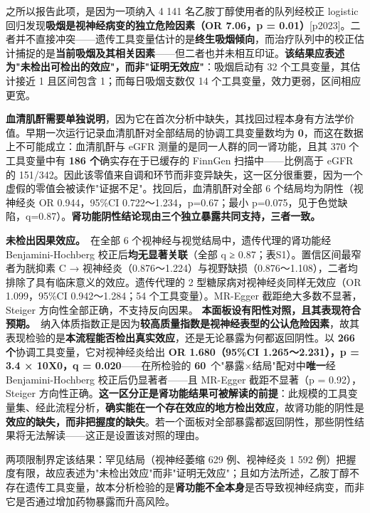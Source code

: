 \documentclass[UTF8,fontset=windows,11pt]{ctexart}
\begin{document}
之所以报告此项，是因为一项纳入 4 141 名乙胺丁醇使用者的队列经校正 logistic 回归发现\textbf{吸烟是视神经病变的独立危险因素（OR 7.06，p = 0.01）}[p2023]。二者并不直接冲突——遗传工具变量估计的是\textbf{终生吸烟倾向}，而治疗队列中的校正估计捕捉的是\textbf{当前吸烟及其相关因素}——但二者也并未相互印证。\textbf{该结果应表述为"未检出可检出的效应"，而非"证明无效应"}：吸烟启动有 32 个工具变量，其估计接近 1 且区间包含 1；而每日吸烟支数仅 14 个工具变量，效力更弱，区间相应更宽。

\textbf{血清肌酐需要单独说明}，因为它在首次分析中缺失，其找回过程本身有方法学价值。早期一次运行记录血清肌酐对全部结局的协调工具变量数均为 \textbf{0}，而这在数据上不可能成立：血清肌酐与 eGFR 测量的是同一人群的同一肾功能，且其 370 个工具变量中有 \textbf{186 个}确实存在于已缓存的 FinnGen 扫描中——比例高于 eGFR 的 151/342。因此该零值来自调和环节而非变异缺失，这一区分很重要，因为一个虚假的零值会被读作"证据不足"。找回后，血清肌酐对全部 6 个结局均为阴性（视神经炎 OR 0.944，95\%CI 0.722～1.234，p=0.67；最小 p=0.075，见于色觉缺陷，q=0.87）。\textbf{肾功能阴性结论现由三个独立暴露共同支持，三者一致。}

\textbf{未检出因果效应。}\ 在全部 6 个视神经与视觉结局中，遗传代理的肾功能经 Benjamini-Hochberg 校正后\textbf{均无显著关联}（全部 q ≥ 0.87；表S1）。置信区间最窄者为胱抑素 C → 视神经炎（0.876～1.224）与视野缺损（0.876～1.108），二者均排除了具有临床意义的效应。遗传代理的 2 型糖尿病对视神经炎同样无效应（OR 1.099，95\%CI 0.942～1.284；54 个工具变量）。MR-Egger 截距绝大多数不显著，Steiger 方向性全部正确，不支持反向因果。 \textbf{本面板设有阳性对照，且其表现符合预期。}\ 纳入体质指数正是因为\textbf{较高质量指数是视神经表型的公认危险因素}，故其表现检验的是\textbf{本流程能否检出真实效应}，还是无论暴露为何都返回阴性。以 \textbf{266 个}协调工具变量，它对视神经炎给出 \textbf{OR 1.680（95\%CI 1.265～2.231），p = 3.4 × 10 X0 ，q = 0.020}——在所检验的 \textbf{60}\ 个"暴露×结局"配对中\textbf{唯一}经 Benjamini-Hochberg 校正后仍显著者——且 MR-Egger 截距不显著（p = 0.92），Steiger 方向性正确。\textbf{这一区分正是肾功能结果可被解读的前提}：此规模的工具变量集、经此流程分析，\textbf{确实能在一个存在效应的地方检出效应}，故肾功能的阴性是\textbf{效应的缺失，而非把握度的缺失}。若一个面板对全部暴露都返回阴性，那些阴性结果将无法解读——这正是设置该对照的理由。

两项限制界定该结果：罕见结局（视神经萎缩 629 例、视神经炎 1 592 例）把握度有限，故应表述为"未检出效应"而非"证明无效应"；且如方法所述，乙胺丁醇不存在遗传工具变量，故本分析检验的是\textbf{肾功能不全本身}是否导致视神经病变，而非它是否通过增加药物暴露而升高风险。
\end{document}
